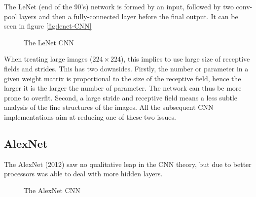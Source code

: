 The LeNet\cite{Lecun98gradient-basedlearning} (end of the 90's) network is formed by an input, followed by two conv-pool layers and then a fully-connected layer before the final output. It can be seen in figure \ref{fig:lenet-CNN} 
\begin{figure}[H]
\begin{center}
\caption{The LeNet CNN}
\end{center}
\end{figure}

When treating large images ($224\times 224$), this implies to use large size of receptive fields and strides. This has two downsides. Firstly, the number or parameter in a given weight matrix is proportional to the size of the receptive field, hence the larger it is the larger the number of parameter. The network can thus be more prone to overfit. Second, a large stride and receptive field means a less subtle analysis of the fine structures of the images. All the subsequent CNN implementations aim at reducing one of these two issues.

\subsection{AlexNet}

The AlexNet\cite{NIPS2012_4824} (2012) saw no qualitative leap in the CNN theory, but due to better processors was able to deal with more hidden layers.

\begin{figure}[H]
\begin{center}
\caption{The AlexNet CNN}
\end{center}
\end{figure}

